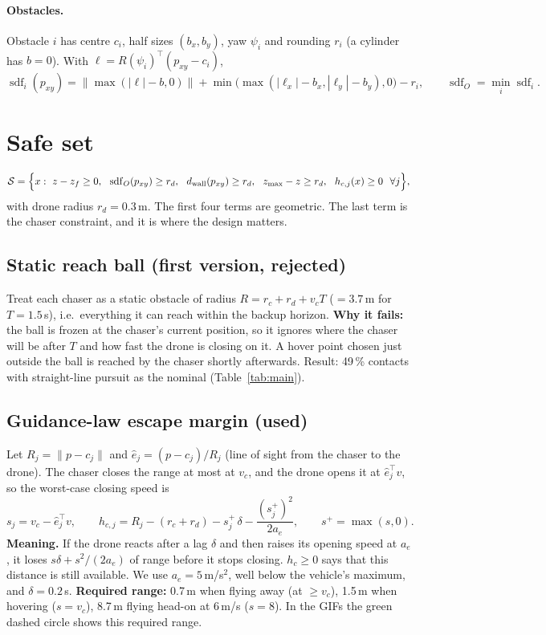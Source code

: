 \documentclass[11pt]{article}
\newcommand{\sdf}{\operatorname{sdf}}
\newcommand{\Safe}{\mathcal{S}}
\begin{document}
\paragraph{Obstacles.}
Obstacle $i$ has centre $c_i$, half sizes $(b_x,b_y)$, yaw $\psi_i$ and rounding $r_i$ (a cylinder has $b=0$). With $\ell=R(\psi_i)^\top(p_{xy}-c_i)$,
\begin{equation}
\sdf_i(p_{xy})=\big\|\max(|\ell|-b,0)\big\|+\min\!\big(\max(|\ell_x|-b_x,|\ell_y|-b_y),0\big)-r_i,
\qquad \sdf_O=\min_i \sdf_i .
\end{equation}

\section{Safe set}\label{sec:safe}

\begin{equation}
\Safe=\Big\{x:\ z-z_f\ge0,\ \ \sdf_O(p_{xy})\ge r_d,\ \ d_{\rm wall}(p_{xy})\ge r_d,\ \ z_{\max}-z\ge r_d,\ \ h_{c,j}(x)\ge 0\ \ \forall j\Big\},
\end{equation}
with drone radius $r_d=0.3$\,m. The first four terms are geometric. The last term is the chaser constraint, and it is where the design matters.

\subsection{Static reach ball (first version, rejected)}
Treat each chaser as a static obstacle of radius $R=r_c+r_d+v_cT$ ($=3.7$\,m for $T=1.5$\,s), i.e.\ everything it can reach within the backup horizon.
\textbf{Why it fails:} the ball is frozen at the chaser's current position, so it ignores where the chaser will be after $T$ and how fast the drone is closing on it.
A hover point chosen just outside the ball is reached by the chaser shortly afterwards.
Result: 49\,\% contacts with straight-line pursuit as the nominal (Table~\ref{tab:main}).

\subsection{Guidance-law escape margin (used)}
Let $R_j=\|p-c_j\|$ and $\hat e_j=(p-c_j)/R_j$ (line of sight from the chaser to the drone). The chaser closes the range at most at $v_c$, and the drone opens it at $\hat e_j^\top v$, so the worst-case closing speed is
\begin{equation}
s_j=v_c-\hat e_j^\top v,\qquad
h_{c,j}=R_j-(r_c+r_d)-s_j^+\,\delta-\frac{(s_j^+)^2}{2a_e},\qquad s^+=\max(s,0).
\end{equation}
\textbf{Meaning.} If the drone reacts after a lag $\delta$ and then raises its opening speed at $a_e$, it loses $s\delta+s^2/(2a_e)$ of range before it stops closing.
$h_c\ge0$ says that this distance is still available. We use $a_e=5$\,m/s$^2$, well below the vehicle's maximum, and $\delta=0.2$\,s.
\textbf{Required range:} 0.7\,m when flying away (at $\ge v_c$), 1.5\,m when hovering ($s=v_c$), 8.7\,m flying head-on at 6\,m/s ($s=8$).
In the GIFs the green dashed circle shows this required range.
\end{document}

